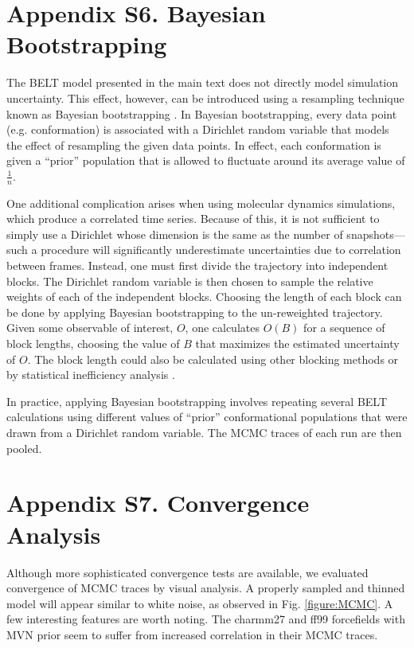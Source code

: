 \documentclass[12pt]{article}
\begin{document}
\newpage

\section*{Appendix S6.  Bayesian Bootstrapping}

The BELT model presented in the main text does not directly model simulation uncertainty.  This effect, however, can be introduced using a resampling technique known as Bayesian bootstrapping \cite{rubin1981}.  In Bayesian bootstrapping, every data point (e.g. conformation) is associated with a Dirichlet random variable that models the effect of resampling the given data points.  In effect, each conformation is given a ``prior'' population that is allowed to fluctuate around its average value of $\frac{1}{n}$.  

One additional complication arises when using molecular dynamics simulations, which produce a correlated time series.  Because of this, it is not sufficient to simply use a Dirichlet whose dimension is the same as the number of snapshots---such a procedure will significantly underestimate uncertainties due to correlation between frames.  Instead, one must first divide the trajectory into independent blocks.  The Dirichlet random variable is then chosen to sample the relative weights of each of the independent blocks.  Choosing the length of each block can be done by applying Bayesian bootstrapping to the un-reweighted trajectory.  Given some observable of interest, $O$, one calculates $O(B)$ for a sequence of block lengths, choosing the value of $B$ that maximizes the estimated uncertainty of $O$.  The block length could also be calculated using other blocking methods \cite{flyvbjerg1989error} or by statistical inefficiency analysis \cite{shirts2008}.  

In practice, applying Bayesian bootstrapping involves repeating several BELT calculations using different values of ``prior'' conformational populations that were drawn from a Dirichlet random variable.  The MCMC traces of each run are then pooled.  

\newpage

\section*{Appendix S7.  Convergence Analysis}

Although more sophisticated convergence tests are available, we evaluated convergence of MCMC traces by visual analysis.  A properly sampled and thinned model will appear similar to white noise, as observed in Fig. \ref{figure:MCMC}.  A few interesting features are worth noting.  The charmm27 and ff99 forcefields with MVN prior seem to suffer from increased correlation in their MCMC traces.  
\end{document}
